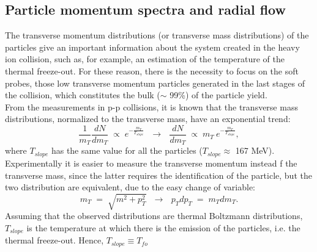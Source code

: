 \subsection{Particle momentum spectra and radial flow}
The transverse momentum distributions (or transverse mass distributions) of the particles give an important information about the system created in the heavy ion collision, such as, for example, an estimation of the temperature of the thermal freeze-out. For these reason, there is the necessity to focus on the soft probes, those low transverse momentum particles generated in the last stages of the collision, which constitutes the bulk ($\sim$ 99\%) of the particle yield.\\
From the measurements in p-p collisions, it is known that the transverse mass distributions, normalized to the transverse mass, have an exponential trend:
\begin{equation}
 \frac{1}{m_{T}}\frac{dN}{dm_{T}}\; \propto \; e^{-\frac{m_{T}}{T_{slope}}} \ \ \ \longrightarrow \ \ \ \frac{dN}{dm_{T}}\; \propto \;m_{T}\: e^{-\frac{m_{T}}{T_{slope}}},
\end{equation}
where $T_{slope}$ has the same value for all the particles ($T_{slope} \approx $ 167 MeV).
Experimentally it is easier to measure the transverse momentum instead f the transverse mass, since the latter requires the identification of the particle, but the two distribution are equivalent, due to the easy change of variable:
\begin{equation}
 m_{T}\;=\;\sqrt{m^{2}+p_{T}^2} \ \ \ \longrightarrow \ \ \  p_{T}dp_{T}\;=\;m_{T}dm_{T}.
\end{equation}
Assuming that the observed distributions are thermal Boltzmann distributions, $T_{slope}$ is the temperature at which there is the emission of the particles, i.e. the thermal freeze-out. Hence, $T_{slope} \equiv T_{fo}$\\
%
